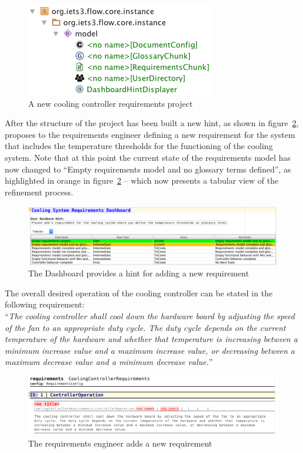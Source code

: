 \begin{figure}[!h]
\centering 
\includegraphics[width=.5\textwidth]{./figures/NewProject.png}
\caption{A new cooling controller requirements project}
\label{fig:newreq_proj}
\end{figure}

After the structure of the project has been built a new hint, as shown in
figure~\ref{fig:dashboard_newreq}, proposes to
the requirements engineer defining a new requirement for the system that
includes the temperature thresholds for the functioning of the cooling system.
Note that at this point the current state of the requirements model has now
changed to ``Empty requirements model and no glossary terms defined'', as
highlighted in orange in figure~\ref{fig:dashboard_newreq} -- which now presents
a tabular view of the refinement process.

\begin{figure}[!h]
\centering 
\includegraphics[width=1\textwidth]{./figures/DefineCoolingReq.png}
\caption{The Dashboard provides a hint for adding a new requirement}
\label{fig:dashboard_newreq}
\end{figure}

The overall desired operation of the cooling controller can be stated in the
following requirement:\\

``\emph{The cooling controller shall cool down the hardware board by adjusting
the speed of the fan to an appropriate duty cycle. The duty cycle depends on the
current temperature of the hardware and whether that temperature is increasing
between a minimum increase value and a maximum increase value, or decreasing
between a maximum decrease value and a minimum decrease value.}''\\
 
\begin{figure}[!h]
\centering 
\includegraphics[width=1\textwidth]{./figures/textReqIncomplete.png}
\caption{The requirements engineer adds a new requirement}
\label{fig:new_req}
\end{figure}

